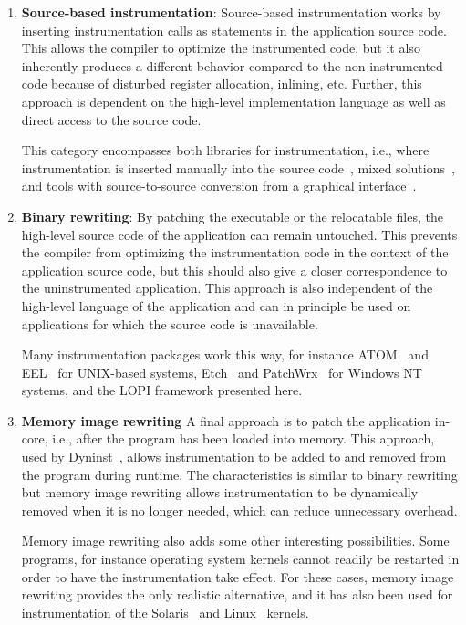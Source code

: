 \begin{enumerate}
\item \textbf{Source-based instrumentation}: Source-based instrumentation
  works by inserting instrumentation calls as statements in the application
  source code. This allows the compiler to optimize the instrumented code, but
  it also inherently produces a different behavior compared to the
  non-instrumented code because of disturbed register allocation, inlining,
  etc. Further, this approach is dependent on the high-level implementation
  language as well as direct access to the source code.

  This category encompasses both libraries for instrumentation, i.e., where
  instrumentation is inserted manually into the source
  code~\cite{london2001papi}, mixed solutions~\cite{garcia2003PET}, and tools
  with source-to-source conversion from a graphical
  interface~\cite{steigner2001cosmos}.

\item \textbf{Binary rewriting}: By patching the executable or the relocatable
  files, the high-level source code of the application can remain untouched.
  This prevents the compiler from optimizing the instrumentation code in the
  context of the application source code, but this should also give a closer
  correspondence to the uninstrumented application. This approach is also
  independent of the high-level language of the application and can in
  principle be used on applications for which the source code is unavailable.

  Many instrumentation packages work this way, for instance ATOM~\cite{atom}
  and EEL~\cite{eel} for UNIX-based systems, Etch~\cite{etch} and
  PatchWrx~\cite{casmira98tcw} for Windows NT systems, and the LOPI
  framework presented here.

\item \textbf{Memory image rewriting} A final approach is to patch the
  application in-core, i.e., after the program has been loaded into memory.
  This approach, used by Dyninst~\cite{buck00dyninst, paradyn95}, allows
  instrumentation to be added to and removed from the program during runtime.
  The characteristics is similar to binary rewriting but memory image
  rewriting allows instrumentation to be dynamically removed when it is no
  longer needed, which can reduce unnecessary overhead.

  Memory image rewriting also adds some other interesting possibilities. Some
  programs, for instance operating system kernels cannot readily be restarted
  in order to have the instrumentation take effect. For these cases, memory
  image rewriting provides the only realistic alternative, and it has also
  been used for instrumentation of the Solaris~\cite{tamches1999kerninst} and
  Linux~\cite{pearce02gdi} kernels.
\end{enumerate}

